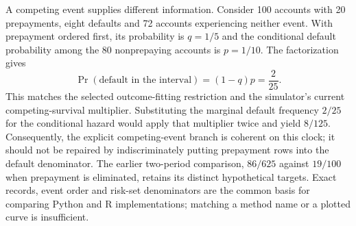 A competing event supplies different information. Consider 100 accounts with
20 prepayments, eight defaults and 72 accounts experiencing neither event.
With prepayment ordered first, its probability is $q=1/5$ and the conditional
default probability among the 80 nonprepaying accounts is $p=1/10$.
The factorization gives
\[
 \Pr(\text{default in the interval})=(1-q)p=\frac{2}{25}.
\]
This matches the selected outcome-fitting restriction and the simulator's
current competing-survival multiplier. Substituting the marginal default
frequency $2/25$ for the conditional hazard would apply that multiplier twice
and yield $8/125$. Consequently, the explicit competing-event branch is
coherent on this clock; it should not be repaired by indiscriminately putting
prepayment rows into the default denominator. The earlier two-period
comparison, $86/625$ against $19/100$ when prepayment is eliminated, retains
its distinct hypothetical targets. Exact records, event order and risk-set
denominators are the common basis for comparing Python and R implementations;
matching a method name or a plotted curve is insufficient.
\citep{rel25pygwitness,rel25pygfit}

